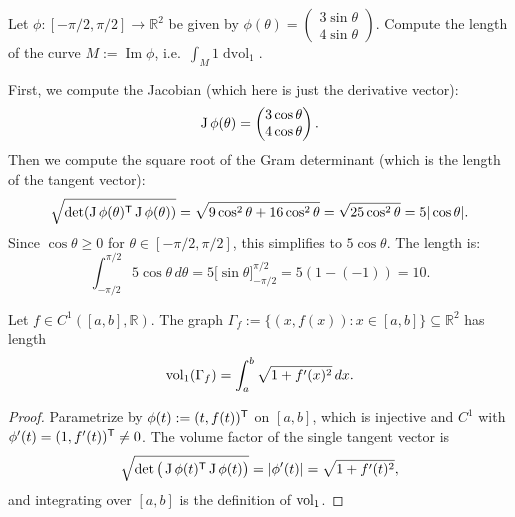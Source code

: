 \begin{example}
\label{ex:line_integral}
Let $\phi : [-\pi/2, \pi/2] \to \mathbb{R}^2$ be given by $\phi(\theta) = \begin{pmatrix} 3\sin\theta \\ 4\sin\theta \end{pmatrix}$.
Compute the length of the curve $M := \operatorname{Im}\phi$, i.e.\ $\int_M 1 \mathop{d\text{vol}}_1$.

First, we compute the Jacobian (which here is just the derivative vector):
\[\operatorname{J}\phi(\theta) = \begin{pmatrix} 3\cos\theta \\ 4\cos\theta \end{pmatrix}.\]
Then we compute the square root of the Gram determinant (which is the length of the tangent
vector):
\[\sqrt{\det(\operatorname{J}\phi(\theta)^{\mathsf{T}} \operatorname{J}\phi(\theta))} = \sqrt{9\cos^2\theta + 16\cos^2\theta} = \sqrt{25\cos^2\theta} = 5|\cos\theta|.\]
Since $\cos\theta \geq 0$ for $\theta \in [-\pi/2, \pi/2]$, this simplifies to $5\cos\theta$.
The length is:
\[\int_{-\pi/2}^{\pi/2} 5\cos\theta \,d\theta = 5\big[\sin\theta\big]_{-\pi/2}^{\pi/2} = 5(1 - (-1)) = 10.\]
\end{example}

\begin{proposition}
\label{prop:graph_arc_length}
Let $f \in C^1([a,b],\mathbb{R})$. The graph
$\Gamma_f := \{(x,f(x)) : x \in [a,b]\} \subseteq \mathbb{R}^2$ has length
\[\operatorname{vol}_1(\Gamma_f) = \int_a^b \sqrt{1+f'(x)^2}\,dx.\]
\end{proposition}

\begin{proof}
Parametrize by $\phi(t) := (t, f(t))^{\mathsf{T}}$ on $[a,b]$, which is injective and $C^1$ with
$\phi'(t) = (1, f'(t))^{\mathsf{T}} \neq 0$. The volume factor of the single tangent vector is
\[\sqrt{\det\big(\operatorname{J}\phi(t)^{\mathsf{T}}\operatorname{J}\phi(t)\big)} = |\phi'(t)|
  = \sqrt{1+f'(t)^2},\]
and integrating over $[a,b]$ is the definition of $\operatorname{vol}_1$.
\end{proof}

